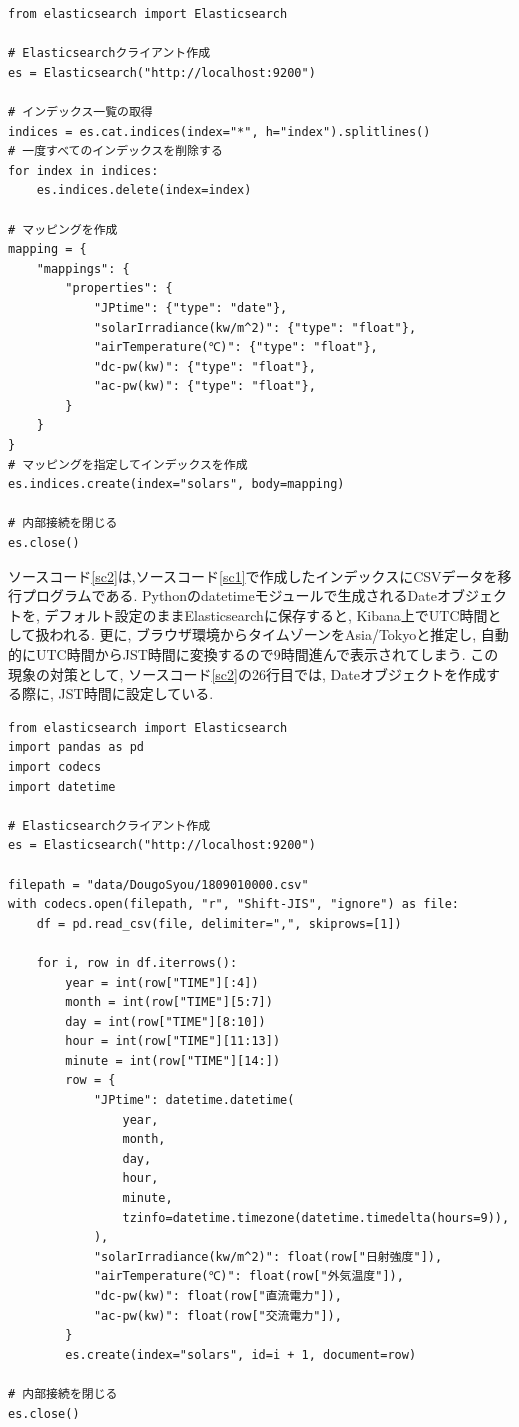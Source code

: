 \documentclass[a4j,12pt,]{jarticle}
\begin{document}
\begin{lstlisting}[caption=CSVデータの移行先となるインデックスを作成するプログラム, label=sc1]
from elasticsearch import Elasticsearch

# Elasticsearchクライアント作成
es = Elasticsearch("http://localhost:9200")

# インデックス一覧の取得
indices = es.cat.indices(index="*", h="index").splitlines()
# 一度すべてのインデックスを削除する
for index in indices:
    es.indices.delete(index=index)

# マッピングを作成
mapping = {
    "mappings": {
        "properties": {
            "JPtime": {"type": "date"},
            "solarIrradiance(kw/m^2)": {"type": "float"},
            "airTemperature(℃)": {"type": "float"},
            "dc-pw(kw)": {"type": "float"},
            "ac-pw(kw)": {"type": "float"},
        }
    }
}
# マッピングを指定してインデックスを作成
es.indices.create(index="solars", body=mapping)

# 内部接続を閉じる
es.close()
\end{lstlisting}
ソースコード\ref{sc2}は,ソースコード\ref{sc1}で作成したインデックスにCSVデータを移行プログラムである.
Pythonのdatetimeモジュールで生成されるDateオブジェクトを, デフォルト設定のままElasticsearchに保存すると, Kibana上でUTC時間として扱われる.
更に, ブラウザ環境からタイムゾーンをAsia/Tokyoと推定し, 自動的にUTC時間からJST時間に変換するので9時間進んで表示されてしまう.
この現象の対策として, ソースコード\ref{sc2}の26行目では, Dateオブジェクトを作成する際に, JST時間に設定している.

\begin{lstlisting}[caption=CSV形式の太陽光発電データをElasticsearchサーバーに移行するプログラム, label=sc2]
from elasticsearch import Elasticsearch
import pandas as pd
import codecs
import datetime

# Elasticsearchクライアント作成
es = Elasticsearch("http://localhost:9200")

filepath = "data/DougoSyou/1809010000.csv"
with codecs.open(filepath, "r", "Shift-JIS", "ignore") as file:
    df = pd.read_csv(file, delimiter=",", skiprows=[1])

    for i, row in df.iterrows():
        year = int(row["TIME"][:4])
        month = int(row["TIME"][5:7])
        day = int(row["TIME"][8:10])
        hour = int(row["TIME"][11:13])
        minute = int(row["TIME"][14:])
        row = {
            "JPtime": datetime.datetime(
                year,
                month,
                day,
                hour,
                minute,
                tzinfo=datetime.timezone(datetime.timedelta(hours=9)),
            ),
            "solarIrradiance(kw/m^2)": float(row["日射強度"]),
            "airTemperature(℃)": float(row["外気温度"]),
            "dc-pw(kw)": float(row["直流電力"]),
            "ac-pw(kw)": float(row["交流電力"]),
        }
        es.create(index="solars", id=i + 1, document=row)

# 内部接続を閉じる
es.close()
\end{lstlisting}
\end{document}

